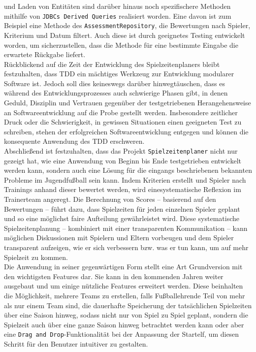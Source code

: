 und Laden von Entitäten sind darüber hinaus noch spezifischere Methoden mithilfe von 
\texttt{JDBCs Derived Queries} realisiert worden. Eine davon ist zum Beispiel eine 
Methode des \texttt{AssessmentRepository}, die Bewertungen nach Spieler, Kriterium 
und Datum filtert. Auch diese ist durch geeignetes Testing entwickelt worden, um 
sicherzustellen, dass die Methode für eine bestimmte Eingabe die erwartete Rückgabe 
liefert. \\ 
Rückblickend auf die Zeit der Entwicklung des Spielzeitenplaners bleibt festzuhalten, 
dass TDD ein mächtiges Werkzeug zur Entwicklung modularer Software ist. Jedoch soll dies 
keineswegs darüber hinwegtäuschen, dass es während des Entwicklungsprozesses auch 
schwierige Phasen gibt, in denen Geduld, Disziplin und Vertrauen gegenüber der 
testgetriebenen Herangehensweise an Softwareentwicklung auf die Probe gestellt werden. 
Insbesondere zeitlicher Druck oder die Schwierigkeit, in gewissen Situationen einen 
geeigneten Test zu schreiben, stehen der erfolgreichen Softwareentwicklung entgegen und 
können die konsequente Anwendung des TDD erschweren. \\ 
Abschließend ist festzuhalten, dass das Projekt \texttt{Spielzeitenplaner} nicht nur 
gezeigt hat, wie eine Anwendung von Beginn bis Ende testgetrieben entwickelt werden kann, 
sondern auch eine Lösung für die eingangs beschriebenen bekannten Probleme im 
Jugendfußball sein kann. Indem Kriterien erstellt und Spieler nach Trainings anhand 
dieser bewertet werden, wird einesystematische Reflexion im Trainerteam angeregt. Die 
Berechnung von Scores -- basierend auf den Bewertungen -- führt dazu, dass Spielzeiten 
für jeden einzelnen Spieler geplant und so eine möglichst faire Aufteilung gewährleistet 
wird. Diese systematische Spielzeitenplanung -- kombiniert mit einer transparenten 
Kommunikation -- kann möglichen Diskussionen mit Spielern und Eltern vorbeugen und dem 
Spieler transparent aufzeigen, wie er sich verbessern bzw. was er tun kann, um auf mehr 
Spielzeit zu kommen. \\ 
Die Anwendung in seiner gegenwärtigen Form stellt eine Art Grundversion mit den 
wichtigsten Features dar. Sie kann in den kommenden Jahren weiter ausgebaut und um 
einige nützliche Features erweitert werden. Diese beinhalten die Möglichkeit, mehrere 
Teams zu erstellen, falls Fußballehrende Teil von mehr als nur einem Team sind, die 
dauerhafte Speicherung der tatsächlichen Spielzeiten über eine Saison hinweg, sodass 
nicht nur von Spiel zu Spiel geplant, sondern die Spielzeit auch über eine ganze Saison 
hinweg betrachtet werden kann oder aber eine \texttt{Drag and Drop}-Funktionalität 
bei der Anpassung der Startelf, um diesen Schritt für den Benutzer intuitiver zu 
gestalten. 

